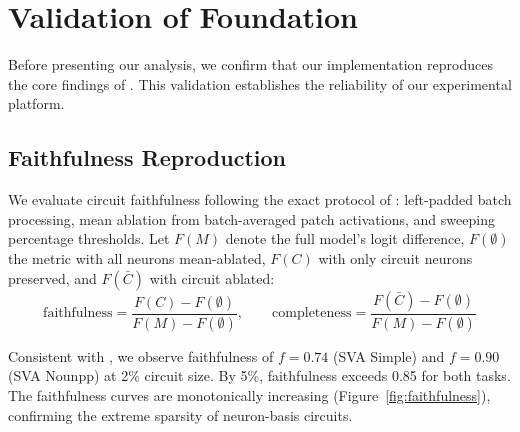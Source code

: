 \documentclass[11pt]{article}
\begin{document}
\section{Validation of Foundation}
\label{sec:validation}

Before presenting our analysis, we confirm that our implementation reproduces the core findings of \citet{arora2025circuits}.
This validation establishes the reliability of our experimental platform.

\subsection{Faithfulness Reproduction}
\label{sec:faithfulness}

We evaluate circuit faithfulness following the exact protocol of \citet{arora2025circuits}: left-padded batch processing, mean ablation from batch-averaged patch activations, and sweeping percentage thresholds.
Let $F(M)$ denote the full model's logit difference, $F(\emptyset)$ the metric with all neurons mean-ablated, $F(C)$ with only circuit neurons preserved, and $F(\bar{C})$ with circuit ablated:
\begin{equation}
    \text{faithfulness} = \frac{F(C) - F(\emptyset)}{F(M) - F(\emptyset)}, \qquad
    \text{completeness} = \frac{F(\bar{C}) - F(\emptyset)}{F(M) - F(\emptyset)}
\end{equation}

Consistent with \citet{arora2025circuits}, we observe faithfulness of $f{=}0.74$ (SVA Simple) and $f{=}0.90$ (SVA Nounpp) at 2\% circuit size.
By 5\%, faithfulness exceeds 0.85 for both tasks.
The faithfulness curves are monotonically increasing (Figure~\ref{fig:faithfulness}), confirming the extreme sparsity of neuron-basis circuits.
\end{document}
